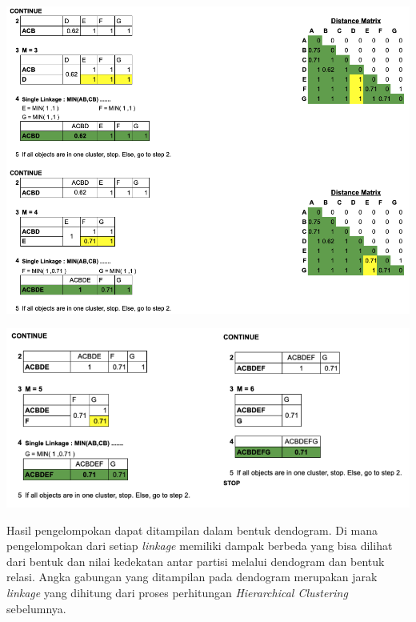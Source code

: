 \begin{center}
	\includegraphics[width=14cm]{img/bab_3/hc_detail_3.png}
	\label{fig:hc_detail_3}
\end{center}

\begin{center}
	\includegraphics[width=14cm]{img/bab_3/hc_detail_4.png}
	\label{fig:hc_detail_4}
\end{center}

Hasil pengelompokan dapat ditampilan dalam bentuk dendogram.  Di mana pengelompokan dari setiap \textit{linkage} memiliki dampak berbeda yang bisa dilihat dari bentuk dan nilai kedekatan antar partisi melalui dendogram dan bentuk relasi. Angka gabungan yang ditampilan pada dendogram merupakan jarak \textit{linkage} yang dihitung dari proses perhitungan \textit{Hierarchical Clustering} sebelumnya.


